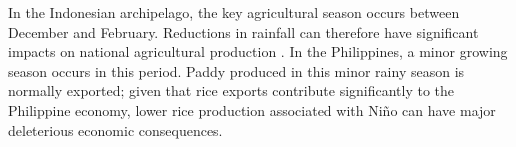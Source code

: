 \documentclass[12pt]{article}
\begin{document}
In the Indonesian archipelago, the key agricultural season occurs between December and February. Reductions in rainfall can therefore have significant impacts on national agricultural production \cite{naylor2001using}. In the Philippines, a minor growing season occurs in this period. Paddy produced in this minor rainy season is normally exported; given that rice exports contribute significantly to the Philippine economy, lower rice production associated with Ni{\~n}o can have major deleterious economic consequences.



\end{document}
